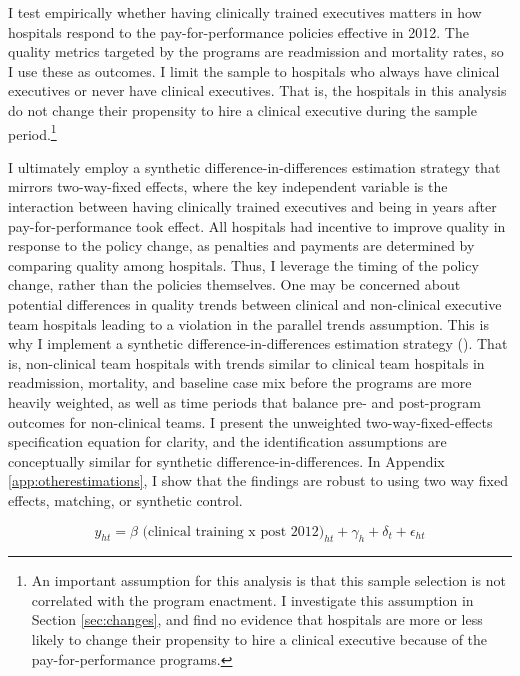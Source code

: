 \documentclass[12pt]{article}
\begin{document}
    I test empirically whether having clinically trained executives matters in how hospitals respond to the pay-for-performance policies effective in 2012. The quality metrics targeted by the programs are readmission and mortality rates, so I use these as outcomes. I limit the sample to hospitals who always have clinical executives or never have clinical executives. That is, the hospitals in this analysis do not change their propensity to hire a clinical executive during the sample period.\footnote{An important assumption for this analysis is that this sample selection is not correlated with the program enactment. I investigate this assumption in Section \ref{sec:changes}, and find no evidence that hospitals are more or less likely to change their propensity to hire a clinical executive because of the pay-for-performance programs. }
    
    I ultimately employ a synthetic difference-in-differences estimation strategy that mirrors two-way-fixed effects, where the key independent variable is the interaction between having clinically trained executives and being in years after pay-for-performance took effect. All hospitals had incentive to improve quality in response to the policy change, as penalties and payments are determined by comparing quality among hospitals. Thus, I leverage the timing of the policy change, rather than the policies themselves. One may be concerned about potential differences in quality trends between clinical and non-clinical executive team hospitals leading to a violation in the parallel trends assumption. This is why I implement a synthetic difference-in-differences estimation strategy (\cite{arkhangelsky2021synthetic}). That is, non-clinical team hospitals with trends similar to clinical team hospitals in readmission, mortality, and baseline case mix before the programs are more heavily weighted, as well as time periods that balance pre- and post-program outcomes for non-clinical teams. I present the unweighted two-way-fixed-effects specification equation for clarity, and the identification assumptions are conceptually similar for synthetic difference-in-differences. In Appendix \ref{app:otherestimations}, I show that the findings are robust to using two way fixed effects, matching, or synthetic control. 

    \begin{equation}
    \label{eq:clinical}
    y_{ht} = \beta \text{ (clinical training x post 2012)}_{ht} + \gamma_{h} + \delta_t + \epsilon_{ht}
    \end{equation}
    
\end{document}
